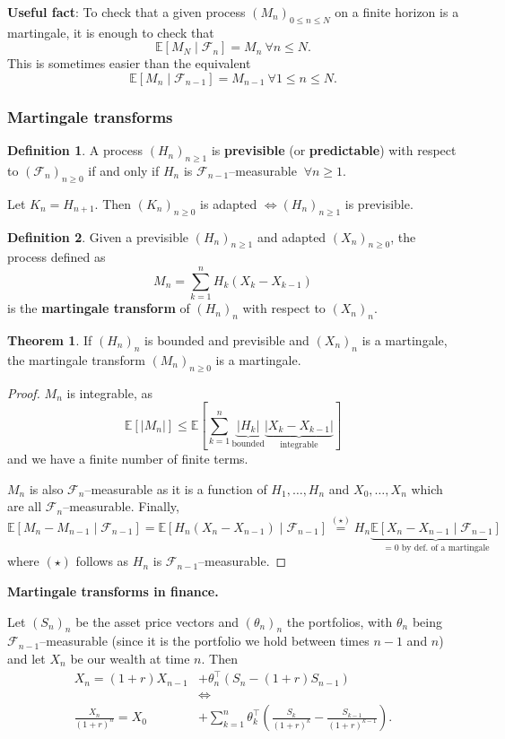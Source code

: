 \documentclass{article}
\theoremstyle{definition}
\newtheorem{theorem}{Theorem}[section]
\newtheorem{defn}{Definition}[section]
\begin{document}
\textbf{Useful fact}: To check that a given process $(M_n)_{0\le n \le N}$ on a finite horizon is a martingale, it is enough to check that 
\[
\mathbb{E}[M_N \mid \mathcal{F}_n] = M_n ~\forall n\le N.
\]
This is sometimes easier than the equivalent 
\[
\mathbb{E}[M_n \mid \mathcal{F}_{n-1}] = M_{n-1} ~\forall 1\le n\le N.
\]
\subsubsection{Martingale transforms}
\begin{defn}
    A process $(H_n)_{n\ge 1}$ is \textbf{previsible} (or \textbf{predictable}) with respect to $(\mathcal{F}_n)_{n\ge 0}$ if and only if $H_n$ is $\mathcal{F}_{n-1}$--measurable $~\forall n\ge 1$.
\end{defn}
Let $K_n = H_{n+1}$. Then $(K_n)_{n\ge 0}$ is adapted $\iff (H_n)_{n\ge 1}$ is previsible.

\begin{defn}
    Given a previsible $(H_n)_{n\ge 1}$ and adapted $(X_n)_{n\ge 0}$, the process defined as \[
    M_n = \sum_{k=1}^{n} H_k(X_k-X_{k-1})
    \]
    is the \textbf{martingale transform} of $(H_n)_n$ with respect to $(X_n)_n$.
\end{defn}
\begin{theorem}
    If $(H_n)_n$ is bounded and previsible and $(X_n)_n$ is a martingale, the martingale transform $(M_n)_{n\ge 0}$ is a martingale.
\end{theorem}
\begin{proof}
    $M_n$ is integrable, as $$\mathbb{E}[|M_n|]\le \mathbb{E}[\sum_{k=1}^{n} \underbrace{|H_k|}_{\text{bounded}}\underbrace{|X_k-X_{k-1}|}_{\text{integrable}}]$$ 
    and we have a finite number of finite terms.

    $M_n$ is also $\mathcal{F}_n$--measurable as it is a function of $H_1,\ldots,H_n$ and $X_0,\ldots,X_n$ which are all $\mathcal{F}_n$--measurable. Finally, 
    \[
    \mathbb{E}[M_n - M_{n-1} \mid \mathcal{F}_{n-1}] = \mathbb{E}[H_n(X_n-X_{n-1}) \mid \mathcal{F}_{n-1}] \stackrel{(\star)}{=}  H_n \underbrace{\mathbb{E}[X_n-X_{n-1} \mid \mathcal{F}_{n-1}]}_{=0 \text{ by def. of a martingale}}
    \]
    where $(\star)$ follows as $H_n$ is $\mathcal{F}_{n-1}$--measurable.
\end{proof}

\textbf{Martingale transforms in finance.} 

Let $(S_n)_n$ be the asset price vectors and $(\theta_n)_n$ the portfolios, with $\theta_n$ being $\mathcal{F}_{n-1}$--measurable (since it is the portfolio we hold between times $n-1$ and $n$) and let $X_n$ be our wealth at time $n$. Then
\begin{align*}
    X_n = (1+r)X_{n-1} &+ \theta^\top_n(S_n -(1+r)S_{n-1}) \\ &\iff\\  \frac{X_n}{(1+r)^{n}} = X_0 &+ \sum_{k=1}^{n} \theta_k^\top\left(\frac{S_k}{(1+r)^k} - \frac{S_{k-1}}{(1+r)^{k-1}}\right).    
\end{align*}
\end{document}
